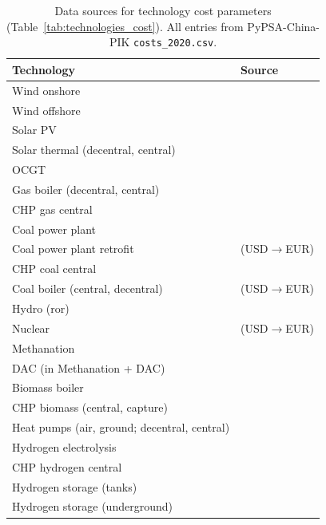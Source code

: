 \documentclass[preprint,12pt]{elsarticle}
\begin{document}
\begin{table}[htbp]
  \centering
  \caption{Data sources for technology cost parameters (Table~\ref{tab:technologies_cost}). All entries from PyPSA-China-PIK \texttt{costs\_2020.csv}.}
  \label{tab:technologies_cost_sources}
  \footnotesize
  \begin{tabularx}{\linewidth}{>{\raggedright\arraybackslash}p{8cm}>{\raggedright\arraybackslash}X}
    \hline
    Technology & Source \\
    \hline
    Wind onshore & \cite{cctd_china_power2020,dea_tech_el_dh} \\
    Wind offshore & \cite{dea_tech_el_dh} \\
    Solar PV & \cite{sun_power_system_cost,dea_tech_el_dh} \\
    Solar thermal (decentral, central) & \cite{pypsa_costs} \\
    OCGT & \cite{dea_tech_el_dh} \\
    Gas boiler (decentral, central) & \cite{dea_heating,dea_tech_el_dh} \\
    CHP gas central & \cite{dea_tech_el_dh} \\
    Coal power plant & \cite{cctd_china_power2020,lazard_lcoe13} \\
    Coal power plant retrofit & \cite{fan2018ccs} (USD$\to$EUR) \\
    CHP coal central & \cite{dea_tech_el_dh} \\
    Coal boiler (central, decentral) & \cite{irena_remap2030} (USD$\to$EUR) \\
    Hydro (ror) & \cite{diw_datadoc} \\
    Nuclear & \cite{columbia_cgep2023,lazard_lcoe13} (USD$\to$EUR) \\
    Methanation & \cite{agora2018synthetic} \\
    DAC (in Methanation + DAC) & \cite{dea_ccs} \\
    Biomass boiler & \cite{dea_heating} \\
    CHP biomass (central, capture) & \cite{dea_tech_el_dh,dea_ccs} \\
    Heat pumps (air, ground; decentral, central) & \cite{dea_heating,dea_tech_el_dh} \\
    Hydrogen electrolysis & \cite{dea_renewable_fuels} \\
    CHP hydrogen central & \cite{dea_tech_el_dh} \\
    Hydrogen storage (tanks) & \cite{stockl2021hydrogen} \\
    Hydrogen storage (underground) & \cite{dea_energy_storage} \\

\end{tabularx}
\end{table}
\end{document}
